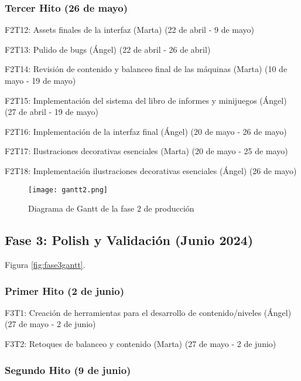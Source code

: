 \subsubsection{Tercer Hito (26 de mayo)}

\begin{compactitem}
\item F2T12: Assets finales de la interfaz (Marta) (22 de abril - 9 de mayo)
\item F2T13: Pulido de bugs (Ángel) (22 de abril - 26 de abril)
\item F2T14: Revisión de contenido y balanceo final de las máquinas (Marta) (10 de mayo - 19 de mayo)
\item F2T15: Implementación del sistema del libro de informes y minijuegos (Ángel) (27 de abril - 19 de mayo)
\item F2T16: Implementación de la interfaz final (Ángel) (20 de mayo - 26 de mayo)
\item F2T17: Ilustraciones decorativas esenciales (Marta) (20 de mayo - 25 de mayo)
\item F2T18: Implementación ilustraciones decorativas esenciales (Ángel) (26 de mayo)
\end{compactitem}

\begin{figure}[H]
  \centering
	\texttt{[image: gantt2.png]}
  \caption{Diagrama de Gantt de la fase 2 de producción}
  \label{fig:fase2gantt}
\end{figure}

\subsection{Fase 3: Polish y Validación (Junio 2024)}

Figura \ref{fig:fase3gantt}.

\subsubsection{Primer Hito (2 de junio)}

\begin{compactitem}
\item F3T1: Creación de herramientas para el desarrollo de contenido/niveles (Ángel) (27 de mayo - 2 de junio)
\item F3T2: Retoques de balanceo y contenido (Marta) (27 de mayo - 2 de junio)
\end{compactitem}

\subsubsection{Segundo Hito (9 de junio)}

